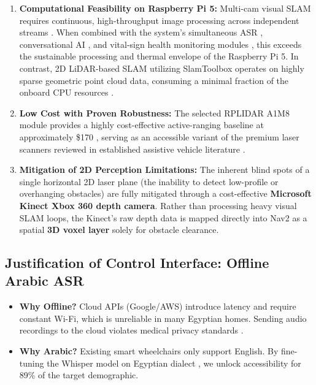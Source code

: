 \documentclass[12pt,a4paper]{report}
\begin{document}
\begin{enumerate}
    \item \textbf{Computational Feasibility on Raspberry Pi 5:} Multi-cam visual SLAM requires continuous, high-throughput image processing across independent streams \cite{orbslam3}. When combined with the system's simultaneous ASR , conversational AI \cite{llama}, and vital-sign health monitoring modules \cite{sonekar_2024}, this exceeds the sustainable processing and thermal envelope of the Raspberry Pi 5. In contrast, 2D LiDAR-based SLAM utilizing SlamToolbox operates on highly sparse geometric point cloud data, consuming a minimal fraction of the onboard CPU resources \cite{tu2025design,SlamToolbox}.
    \item \textbf{Low Cost with Proven Robustness:} The selected RPLIDAR A1M8 module provides a highly cost-effective active-ranging baseline at approximately \$170 \cite{rplidar_a1m8}, serving as an accessible variant of the premium laser scanners reviewed in established assistive vehicle literature \cite{baltazar_2021,hou_2024}.
    \item \textbf{Mitigation of 2D Perception Limitations:} The inherent blind spots of a single horizontal 2D laser plane (the inability to detect low-profile or overhanging obstacles) are fully mitigated through a cost-effective \textbf{Microsoft Kinect Xbox 360 depth camera}. Rather than processing heavy visual SLAM loops, the Kinect's raw depth data is mapped directly into Nav2 as a spatial \textbf{3D voxel layer} \cite{nav2} solely for obstacle clearance.
\end{enumerate}

\subsection{Justification of Control Interface: Offline Arabic ASR}

\begin{itemize}
    \item \textbf{Why Offline?} Cloud APIs (Google/AWS) introduce latency and require constant Wi-Fi, which is unreliable in many Egyptian homes. Sending audio recordings to the cloud violates medical privacy standards \cite{egypt_law_151}.
    \item \textbf{Why Arabic?} Existing smart wheelchairs only support English. By fine-tuning the Whisper model on Egyptian dialect , we unlock accessibility for 89\% of the target demographic.
\end{itemize}
\end{document}
